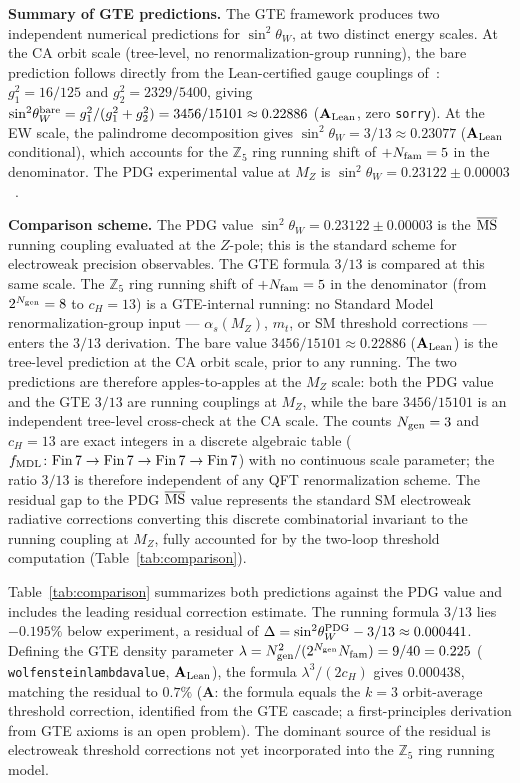 \documentclass[11pt]{article}
\theoremstyle{remark}
\newcommand{\Ngen}{N_{\rm gen}}
\newcommand{\Nfam}{N_{\rm fam}}
\newcommand{\cH}{c_H}
\newcommand{\lean}[1]{%
  \penalty-100
  \begingroup\def\_{\textunderscore\allowbreak}\texttt{#1}\endgroup}
\newcommand{\sinwsq}{\sin^2\!\theta_W}
\newcommand{\CatA}{\textbf{A}}
\newcommand{\CatAL}{\ensuremath{\textbf{A}_{\rm Lean}}}
\begin{document}
\textbf{Summary of GTE predictions.}
The GTE framework produces two independent numerical predictions for $\sinwsq$, at two
distinct energy scales.
At the CA orbit scale (tree-level, no renormalization-group running), the bare prediction
follows directly from the Lean-certified gauge couplings of~\cite{Spivack2026_SM_UGP}:
$g_1^2 = 16/125$ and $g_2^2 = 2329/5400$, giving $\sinwsq^{\rm bare} = g_1^2/(g_1^2 + g_2^2)
= 3456/15101 \approx 0.22886$ ($\CatAL$, zero \texttt{sorry}).
At the EW scale, the palindrome decomposition gives $\sinwsq = 3/13 \approx 0.23077$
($\CatAL$ conditional), which accounts for the $\mathbb{Z}_5$ ring running shift of
$+\Nfam = 5$ in the denominator.
The PDG experimental value at $M_Z$ is $\sinwsq = 0.23122 \pm 0.00003$~\cite{ParticleDataGroup2022}.

\medskip
\noindent\textbf{Comparison scheme.}
The PDG value $\sinwsq = 0.23122 \pm 0.00003$ is the $\overline{\rm MS}$ running coupling evaluated at the $Z$-pole; this is the standard scheme for electroweak precision observables.
The GTE formula $3/13$ is compared at this same scale.
The $\mathbb{Z}_5$ ring running shift of $+\Nfam = 5$ in the denominator (from $2^{\Ngen} = 8$ to $\cH = 13$) is a GTE-internal running: no Standard Model renormalization-group input --- $\alpha_s(M_Z)$, $m_t$, or SM threshold corrections --- enters the $3/13$ derivation.
The bare value $3456/15101 \approx 0.22886$ ($\CatAL$) is the tree-level prediction at the CA orbit scale, prior to any running.
The two predictions are therefore apples-to-apples at the $M_Z$ scale: both the PDG value and the GTE $3/13$ are running couplings at $M_Z$, while the bare $3456/15101$ is an independent tree-level cross-check at the CA scale.
The counts $\Ngen = 3$ and $\cH = 13$ are exact integers in a discrete algebraic table ($f_{\rm MDL}\colon \mathrm{Fin}\,7 \to \mathrm{Fin}\,7 \to \mathrm{Fin}\,7 \to \mathrm{Fin}\,7$) with no continuous scale parameter; the ratio $3/13$ is therefore independent of any QFT renormalization scheme.  The residual gap to the PDG $\overline{\rm MS}$ value represents the standard SM electroweak radiative corrections converting this discrete combinatorial invariant to the running coupling at $M_Z$, fully accounted for by the two-loop threshold computation (Table~\ref{tab:comparison}).

Table~\ref{tab:comparison} summarizes both predictions against the PDG value and
includes the leading residual correction estimate.
The running formula $3/13$ lies $-0.195\%$ below experiment, a residual of
$\Delta = \sinwsq^{\rm PDG} - 3/13 \approx 0.000441$.
Defining the GTE density parameter $\lambda = \Ngen^2/(2^{\Ngen} \Nfam) = 9/40 = 0.225$
(\lean{wolfenstein\_lambda\_value}, $\CatAL$), the formula $\lambda^3/(2\cH)$ gives
$0.000438$, matching the residual to $0.7\%$ ($\CatA$: the formula equals the $k=3$
orbit-average threshold correction, identified from the GTE cascade; a first-principles
derivation from GTE axioms is an open problem).
The dominant source of the residual is electroweak threshold corrections not yet
incorporated into the $\mathbb{Z}_5$ ring running model.
\end{document}
